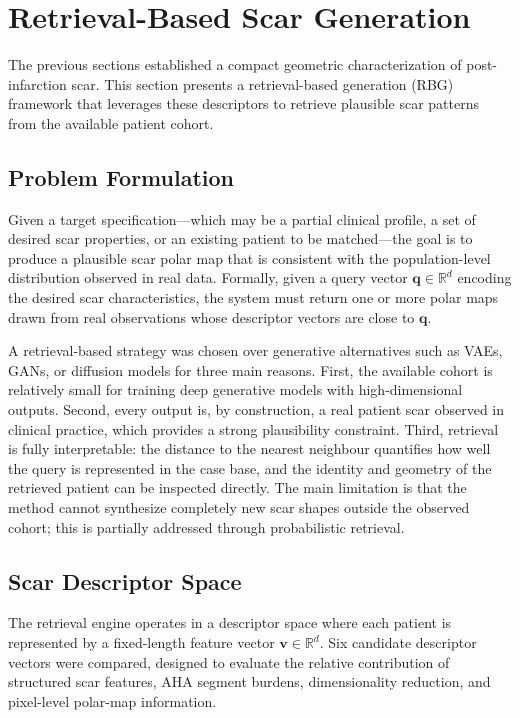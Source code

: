 \section{Retrieval-Based Scar Generation}
\label{sec:retrieval}

The previous sections established a compact geometric characterization of post-infarction
scar. This section presents a retrieval-based generation (RBG) framework that leverages
these descriptors to retrieve plausible scar patterns from the available patient cohort.

\subsection{Problem Formulation}

Given a target specification---which may be a partial clinical profile, a set of desired scar
properties, or an existing patient to be matched---the goal is to produce a plausible scar
polar map that is consistent with the population-level distribution observed in real data.
Formally, given a query vector $\mathbf{q} \in \mathbb{R}^d$ encoding the desired scar
characteristics, the system must return one or more polar maps drawn from real observations
whose descriptor vectors are close to $\mathbf{q}$.

A retrieval-based strategy was chosen over generative alternatives such as VAEs, GANs, or
diffusion models for three main reasons. First, the available cohort is relatively small for
training deep generative models with high-dimensional outputs. Second, every output is, by
construction, a real patient scar observed in clinical practice, which provides a strong
plausibility constraint. Third, retrieval is fully interpretable: the distance to the nearest
neighbour quantifies how well the query is represented in the case base, and the identity and
geometry of the retrieved patient can be inspected directly. The main limitation is that the
method cannot synthesize completely new scar shapes outside the observed cohort; this is
partially addressed through probabilistic retrieval.

\subsection{Scar Descriptor Space}

The retrieval engine operates in a descriptor space where each patient is represented by a
fixed-length feature vector $\mathbf{v} \in \mathbb{R}^d$. Six candidate descriptor vectors
were compared, designed to evaluate the relative contribution of structured scar features,
AHA segment burdens, dimensionality reduction, and pixel-level polar-map information.

